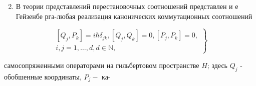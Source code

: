\documentclass[10pt]{article}
\begin{document}
\begin{enumerate}

  \setcounter{enumi}{1}

  \item В теории представлений перестановочных соотношений представлен и е Гейзенбе рга-любая реализация канонических коммутационных соотношений

\end{enumerate}



\[

\left.\begin{array}{c}

{\left[Q_{j}, P_{k}\right]=i \hbar \delta_{j k},\left[Q_{j}, Q_{k}\right]=0,\left[P_{j}, P_{k}\right]=0,} \\

i, j=1, \ldots, d, d \in \mathbb{N},

\end{array}\right\}

\]



самосопряженными операторами на гильбертовом пространстве $H$; здесь $Q_{j}$ - обобшенные координаты, $P_{j}-$ ка-
\end{document}
